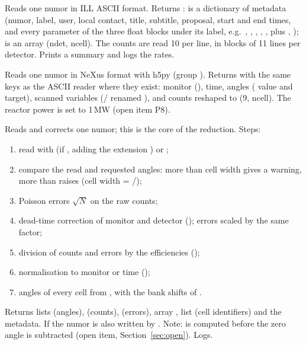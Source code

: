 \documentclass[11pt,a4paper]{article}
\begin{document}
Reads one numor in ILL ASCII format. Returns :
 is a dictionary of metadata (numor, label, user, local contact,
title, subtitle, proposal, start and end times, and every parameter of the
three float blocks under its label, e.g.\ ,
, , ,
, plus , );  is
an array (ndet, ncell). The counts are read 10 per line, in blocks of 11
lines per detector. Prints a summary and logs the rates. \legacy

Reads one numor in NeXus format with h5py (group ). Returns
 with the same keys as the ASCII reader where they
exist: monitor (), time, angles
( value and target), scanned variables
(/ renamed ),
and counts reshaped to (9, ncell). The reactor power is set to 1\,MW
(open item P8). \legacy

 
Reads and corrects one numor; this is the core of the reduction. Steps:
\begin{enumerate}
  \item read with  (if ,
    adding the extension ) or ;
  \item compare the read and requested angles: more than
     cell width gives a warning, more than
     raises  (cell width =
    /);
  \item Poisson errors $\sqrt{N}$ on the raw counts;
  \item dead-time correction of monitor and detector
    (); errors scaled by the same factor;
  \item division of counts and errors by the efficiencies ();
  \item normalisation to monitor or time ();
  \item angles of every cell from , with the bank shifts of
    .
\end{enumerate}
Returns lists  (angles),  (counts),  (errors),
array , list  (cell identifiers) and the metadata. If
 the numor is also written by
. Note:  is computed before the zero angle is
subtracted (open item, Section~\ref{sec:open}). Logs.
\end{document}
